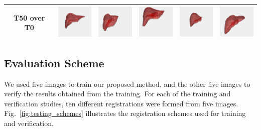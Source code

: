 \documentclass[]{spie}  %
\begin{document}
\begin{table}
\begin{center}
\begin{tabular}{c|c|c|c|c|c}
T50 over T0 & \includegraphics[width=0.7in]{seg_p0t0_t50} & \includegraphics[width=0.7in]{seg_p1t0_t50} & \includegraphics[width=0.7in]{seg_p2t0_t50} & \includegraphics[width=0.7in]{seg_p3t20_t50} & \includegraphics[width=0.7in]{seg_p4t0_t50} \\
\hline
\end{tabular}
\end{center}
\end{table}

\subsection{Evaluation Scheme}

We used five images to train our proposed method, and the other five images to verify the results obtained from the training. For each of the training and verification studies, ten different registrations were formed from five images.
Fig.~\ref{fig:testing_schemes} illustrates the registration schemes used for training and verification.
\end{document}
